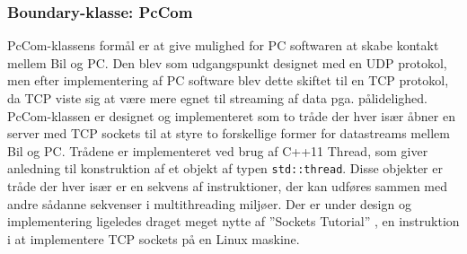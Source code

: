 \subsubsection{Boundary-klasse: PcCom} \label{sec:pccom}
PcCom-klassens formål er at give mulighed for PC softwaren at skabe kontakt mellem Bil og PC. 
Den blev som udgangspunkt designet med en UDP protokol, men efter implementering af PC software blev dette skiftet til en TCP protokol, da TCP viste sig at være mere egnet til streaming af data pga. pålidelighed.
PcCom-klassen er designet og implementeret som to tråde der hver især åbner en server med TCP sockets til at styre to forskellige former for datastreams mellem Bil og PC.
Trådene er implementeret ved brug af C++11 Thread\cite{lib:std::Thread}, som giver anledning til konstruktion af et objekt af typen \texttt{std::thread}. 
Disse objekter er tråde der hver især er en sekvens af instruktioner, der kan udføres sammen med andre sådanne sekvenser i multithreading miljøer. 
Der er under design og implementering ligeledes draget meget nytte af ''Sockets Tutorial'' \cite{lib:socket_tutorial}, en instruktion i at implementere TCP sockets på en Linux maskine.